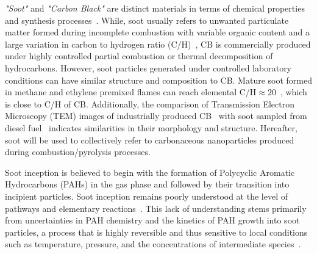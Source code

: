 \textit{"Soot"} and \textit{"Carbon Black"} are distinct materials in terms of chemical properties and synthesis processes~\cite{watson2001carbon}. While, soot usually refers to unwanted particulate matter formed during incomplete combustion with variable organic content and a large variation in carbon to hydrogen ratio (C/H)~\citep{watson2001carbon}, CB is commercially produced under highly controlled partial combustion or thermal decomposition of hydrocarbons. However, soot particles generated under controlled laboratory conditions can have similar structure and composition to CB. Mature soot formed in methane and ethylene premixed flames can reach elemental $\mathrm{C/H}\approx20$~\cite{russo2015dehydrogenation}, which is close to C/H of CB. Additionally, the comparison of Transmission Electron Microscopy (TEM) images of industrially produced CB~\citep{singh2018nanostructure} with soot sampled from diesel fuel~\citep{vander2007hrtem, lapuerta2017morphological} indicates similarities in their morphology and structure. Hereafter, soot will be used to collectively refer to carbonaceous nanoparticles produced during combustion/pyrolysis processes.


Soot inception is believed to begin with the formation of Polycyclic Aromatic Hydrocarbons (PAHs) in the gas phase and followed by their transition into incipient particles. Soot inception remains poorly understood at the level of pathways and elementary reactions~\citep{Wang2011}. This lack of understanding stems primarily from uncertainties in PAH chemistry and the kinetics of PAH growth into soot particles, a process that is highly reversible and thus sensitive to local conditions such as temperature, pressure, and the concentrations of intermediate species~\citep{Wang2011}.


